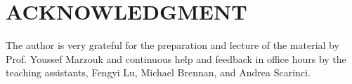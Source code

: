 \documentclass[letterpaper, 10 pt, conference, twocolumn]{ieeeconf}  %
\begin{document}
\clearpage








\section*{ACKNOWLEDGMENT}

The author is very grateful for the preparation and lecture of the material by Prof. Youssef Marzouk and continuous help and feedback in office hours by the teaching assistants, Fengyi Lu, Michael Brennan, and Andrea Scarinci.

\balance
 
%  

\end{document}

